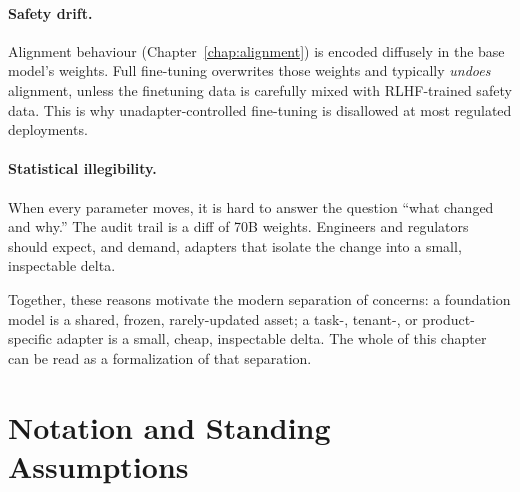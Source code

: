 \paragraph{Safety drift.}
Alignment behaviour (Chapter~\ref{chap:alignment}) is encoded diffusely in the base model's
weights. Full fine-tuning overwrites those weights and typically
\emph{undoes} alignment, unless the finetuning data is carefully
mixed with RLHF-trained safety data. This is why unadapter-controlled
fine-tuning is disallowed at most regulated deployments.

\paragraph{Statistical illegibility.}
When every parameter moves, it is hard to answer the question ``what
changed and why.'' The audit trail is a diff of 70B weights. Engineers
and regulators should expect, and demand, adapters that isolate the
change into a small, inspectable delta.

Together, these reasons motivate the modern separation of concerns:
a foundation model is a shared, frozen, rarely-updated asset; a
task-, tenant-, or product-specific adapter is a small, cheap,
inspectable delta.
The whole of this chapter can be read as a formalization of that
separation.

\section{Notation and Standing Assumptions}
\label{sec:ch8-notation}

